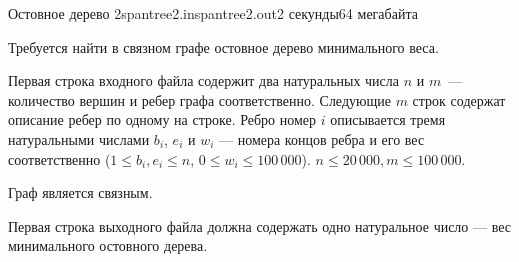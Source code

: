 \begin{problem}{Остовное дерево 2}{spantree2.in}{spantree2.out}{2 секунды}{64 мегабайта}

Требуется найти в связном графе остовное дерево минимального веса.
                                                                              
\InputFile

Первая строка входного файла содержит два натуральных числа $n$ и $m$~--- 
количество вершин и ребер графа соответственно. Следующие $m$ строк содержат 
описание ребер по одному на строке. Ребро номер $i$ описывается тремя 
натуральными числами $b_i$, $e_i$ и $w_i$ --- номера концов ребра и его вес 
соответственно ($1 \le b_i, e_i \le n$, $0 \le w_i \le 100\,000$).
$n \le 20\,000, m \le 100\,000.$

Граф является связным.

\OutputFile

Первая строка выходного файла должна содержать одно натуральное число --- вес минимального остовного дерева.

\Examples

\begin{example}%
%
\end{example}

\end{problem}
